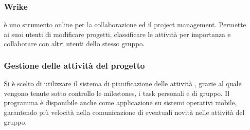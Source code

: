 \subsubsection{Wrike}
 è uno strumento online per la collaborazione ed il project management. Permette ai suoi utenti di modificare progetti, classificare le attività per importanza e collaborare con altri utenti dello stesso gruppo. 

\subsubsection{Gestione delle attività del progetto}
Si è scelto di utilizzare il sistema di pianificazione delle attività , grazie al quale vengono tenute sotto controllo le milestones, i task personali e di gruppo. Il programma  è disponibile anche come applicazione su sistemi operativi mobile, garantendo più velocità nella comunicazione di eventuali novità nelle attività del gruppo.

